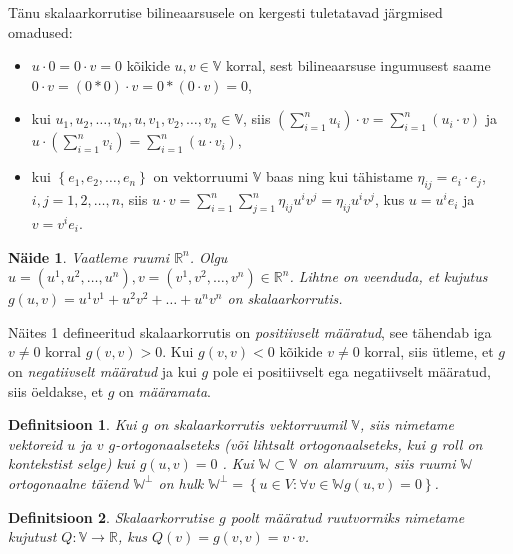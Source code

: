 \documentclass[a4paper,12pt]{article}
\newtheorem{definitsioon}{Definitsioon}[section]
\newtheorem{naide}{Näide}[section]
\numberwithin{equation}{section}
\begin{document}
Tänu skalaarkorrutise bilineaarsusele on kergesti tuletatavad järgmised omadused:
\begin{itemize}
\item $u \cdot 0 = 0 \cdot v = 0$ kõikide $u, v \in \mathbb{V}$ korral, sest bilineaarsuse ingumusest saame $0 \cdot v = \left(0*0\right) \cdot v = 0*\left(0 \cdot v \right) = 0$,
\item kui $u_1, u_2, \dots, u_n, u, v_1, v_2, \dots, v_n \in \mathbb{V}$, siis $\left( \sum_{i = 1}^{n} u_i \right) \cdot v = \sum_{i = 1}^{n}  \left( u_i \cdot v \right)$ ja $u \cdot \left( \sum_{i = 1}^{n} v_i \right) = \sum_{i = 1}^{n}  \left( u \cdot v_i \right)$,
\item kui $\left\lbrace e_1, e_2, \dots, e_n \right\rbrace$ on vektorruumi $\mathbb{V}$ baas ning kui tähistame $\eta_{ij} = e_i \cdot e_j$, $i,j = 1, 2, \dots, n$, siis $u \cdot v = \sum_{i = 1}^{n} \sum_{j = 1}^{n} \eta_{ij} u^i v^j = \eta_{ij} u^i v^j$, kus $u = u^i e_i$ ja $v = v^i e_i$.
\end{itemize}

\begin{naide}
Vaatleme ruumi $\mathbb{R}^{n}$. Olgu $u = \left(u^1, u^2, \dots, u^n \right), v = \left(v^1, v^2, \dots, v^n \right) \in \mathbb{R}^{n}$. Lihtne on veenduda, et kujutus $g \left(u, v \right) = u^1v^1 + u^2v^2 + \dots + u^n v^n$ on skalaarkorrutis.
\end{naide}

Näites 1 defineeritud skalaarkorrutis on \emph{positiivselt määratud}, see tähendab iga $v \neq 0$ korral $g \left(v, v \right) > 0$. Kui $g \left(v, v \right) < 0$ kõikide $v \neq 0$ korral, siis ütleme, et $g$ on \emph{negatiivselt määratud} ja kui $g$ pole ei positiivselt ega negatiivselt määratud, siis öeldakse, et $g$ on \emph{määramata}.

\begin{definitsioon}
Kui $g$ on skalaarkorrutis vektorruumil $\mathbb{V}$, siis nimetame vektoreid $u$ ja $v$ \emph{$g$-ortogonaalseteks} (või lihtsalt ortogonaalseteks, kui $g$ roll on kontekstist selge) kui $g \left( u, v \right) = 0$ . Kui $\mathbb{W} \subset \mathbb{V}$ on alamruum, siis ruumi $\mathbb{W}$ ortogonaalne täiend $\mathbb{W}^{\perp}$ on hulk $\mathbb{W}^{\perp} = \left\lbrace u \in V : \forall v \in  \mathbb{W} g \left(u, v \right) = 0 \right\rbrace$.
\end{definitsioon}
\begin{definitsioon}
Skalaarkorrutise $g$ poolt määratud \emph{ruutvormiks} nimetame kujutust $Q : \mathbb{V} \rightarrow \mathbb{R}$, kus $Q \left( v \right) = g\left(v, v\right) = v \cdot v$.
\end{definitsioon}
\end{document}

